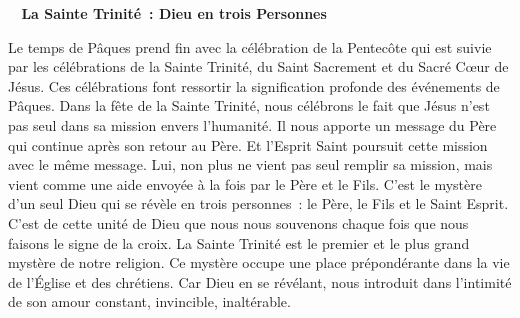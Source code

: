  \begin{center}
 \textbf{
 \og 
La Sainte Trinité : Dieu en trois Personnes
 \fg
 }
 \end{center}

Le temps de Pâques prend fin avec la célébration de la Pentecôte qui est suivie par les célébrations de la Sainte Trinité, du Saint Sacrement et du Sacré Cœur de Jésus. Ces célébrations font ressortir la signification profonde des événements de Pâques. Dans la fête de la Sainte Trinité, nous célébrons le fait que Jésus n’est pas seul dans sa mission envers l’humanité. Il nous apporte un message du Père qui continue après son retour au Père. Et l’Esprit Saint poursuit cette mission avec le même message. Lui, non plus ne vient pas seul remplir sa mission, mais vient comme une aide envoyée à la fois par le Père et le Fils. C’est le mystère d’un seul Dieu qui se révèle en trois personnes : le Père, le Fils et le Saint Esprit. C’est de cette unité de Dieu que nous nous souvenons chaque fois que nous faisons le signe de la croix. La Sainte Trinité est le premier et le plus grand mystère de notre religion.
Ce mystère occupe une place prépondérante dans la vie de l’Église et des chrétiens. Car Dieu en se révélant, nous introduit dans l’intimité de son amour constant, invincible, inaltérable.

